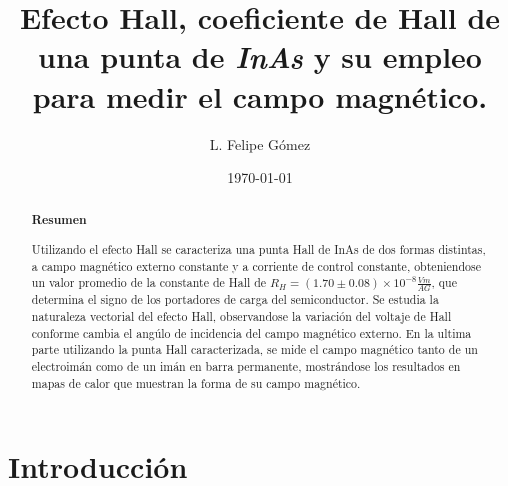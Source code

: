 \documentclass[twocolumn,showpacs,preprintnumbers,amsmath,amssymb]{revtex4-1}
\begin{document}
\renewcommand{\tablename}{Tabla}


\title{Efecto Hall, coeficiente de Hall de una punta de \textit{InAs} y su empleo para medir el campo magnético.}%

\author{L. Felipe Gómez}

\date{\today}



\begin{abstract}

\begin{center}
\textbf{Resumen}
\end{center}

Utilizando el efecto Hall se caracteriza una punta Hall de InAs de dos formas distintas, a campo magnético externo constante y a corriente
de control constante, obteniendose un valor promedio de la constante de Hall de $R_H = (1.70 \pm 0.08)\times10^{-8} \frac{Vm}{AG}$, que determina el signo de los portadores
de carga del semiconductor. Se estudia la naturaleza vectorial del efecto Hall, observandose la variación del voltaje de
Hall conforme cambia el angúlo de incidencia del campo magnético externo. En la ultima parte utilizando la punta Hall
caracterizada, se mide el campo magnético tanto de un electroimán como de un imán en barra permanente, mostrándose los
resultados en mapas de calor que muestran la forma de su campo magnético.

\end{abstract}

\maketitle


\section{Introducción}
\end{document}
